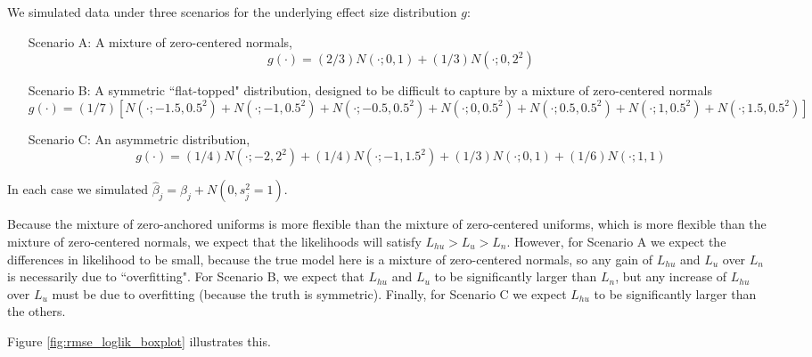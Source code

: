 \documentclass[11pt]{article}
\def\bhat{\hat{\beta}}
\begin{document}
We simulated data under three scenarios for the underlying effect size distribution $g$:
\begin{enumerate}
\item[Scenario A:]
A mixture of zero-centered normals,
\begin{equation}
g(\cdot) =  (2/3) N(\cdot; 0,1) + (1/3) N(\cdot; 0, 2^2)
\end{equation}
\item[Scenario B:]
A symmetric ``flat-topped" distribution, designed to be difficult to capture by a mixture of zero-centered normals 
\begin{equation}
g(\cdot) = (1/7) [N(\cdot; -1.5, 0.5^2) + N(\cdot; -1, 0.5^2) + N(\cdot; -0.5, 0.5^2) + N(\cdot; 0, 0.5^2) + N(\cdot; 0.5, 0.5^2) + N(\cdot; 1, 0.5^2) + N(\cdot; 1.5, 0.5^2)]
\end{equation}
\item[Scenario C:]
An asymmetric distribution, 
\begin{equation}
g(\cdot) = (1/4) N(\cdot; -2 ,2^2) + (1/4) N(\cdot; -1 ,1.5^2) + (1/3) N(\cdot; 0 ,1) + (1/6) N(\cdot; 1,1) 
\end{equation}
\end{enumerate}
In each case we simulated $\bhat_j  = \beta_j + N(0,s^2_j=1)$.

Because the mixture of zero-anchored uniforms is more flexible than the mixture of zero-centered uniforms, which is more flexible
than the mixture of zero-centered normals, we expect that the likelihoods will satisfy $L_{hu} > L_u > L_n$. However, for Scenario A we expect the differences in
likelihood to be small, because the true model here is a mixture of zero-centered normals, so any gain of $L_{hu}$ and $L_u$ over $L_n$ is necessarily due to ``overfitting".
For Scenario B, we expect that $L_{hu}$ and $L_{u}$ to be significantly larger than $L_n$, but any 
increase of $L_{hu}$ over $L_u$ must be due to overfitting (because the truth is symmetric). Finally, for Scenario C we
expect $L_{hu}$ to be significantly larger than the others.

Figure \ref{fig:rmse_loglik_boxplot} illustrates this.
\end{document}
